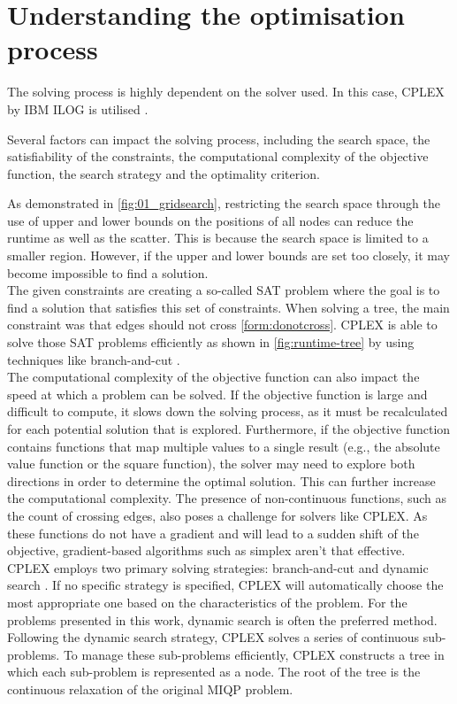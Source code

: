\documentclass{article}
\begin{document}
\newpage
\section*{Understanding the optimisation process}
The solving process is highly dependent on the solver used. In this case, CPLEX by IBM ILOG is utilised \cite{ibm-cplex}.

Several factors can impact the solving process, including the search space, the satisfiability of the constraints, the computational complexity of the objective function, the search strategy and the optimality criterion.

As demonstrated in \ref{fig:01_gridsearch}, restricting the search space through the use of upper and lower bounds on the positions of all nodes can reduce the runtime as well as the scatter. This is because the search space is limited to a smaller region. However, if the upper and lower bounds are set too closely, it may become impossible to find a solution.\\

The given constraints are creating a so-called \ac{SAT} problem where the goal is to find a solution that satisfies this set of constraints. When solving a tree, the main constraint was that edges should not cross \ref{form:donotcross}. CPLEX is able to solve those \ac{SAT} problems efficiently as shown in \ref{fig:runtime-tree} by using techniques like branch-and-cut \cite{ibm-what} \cite{ibm-solve}.\\

The computational complexity of the objective function can also impact the speed at which a problem can be solved. If the objective function is large and difficult to compute, it slows down the solving process, as it must be recalculated for each potential solution that is explored. Furthermore, if the objective function contains functions that map multiple values to a single result (e.g., the absolute value function or the square function), the solver may need to explore both directions in order to determine the optimal solution. This can further increase the computational complexity. The presence of non-continuous functions, such as the count of crossing edges, also poses a challenge for solvers like CPLEX. As these functions do not have a gradient and will lead to a sudden shift of the objective, gradient-based algorithms such as simplex aren't that effective.\\

CPLEX employs two primary solving strategies: branch-and-cut and dynamic search \cite{ibm-dynsearch}. If no specific strategy is specified, CPLEX will automatically choose the most appropriate one based on the characteristics of the problem. For the problems presented in this work, dynamic search is often the preferred method.
Following the dynamic search strategy, CPLEX solves a series of continuous sub-problems. To manage these sub-problems efficiently, CPLEX constructs a tree in which each sub-problem is represented as a node. The root of the tree is the continuous relaxation of the original \ac{MIQP} problem.\\
\end{document}

